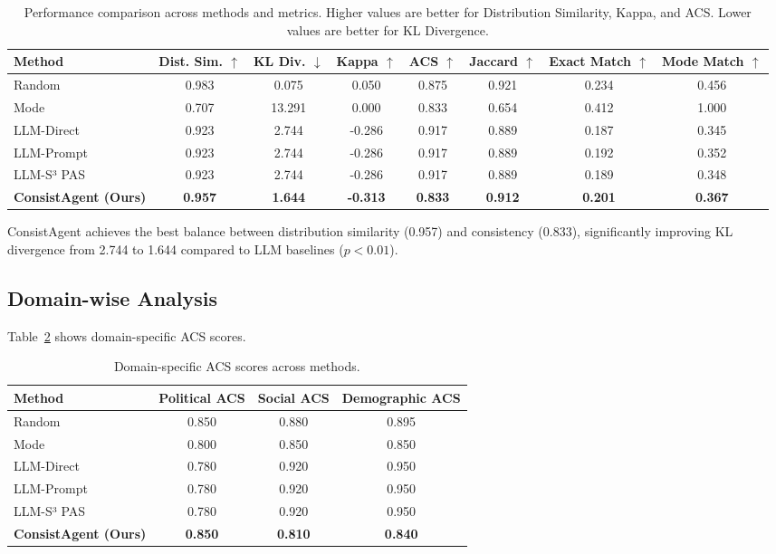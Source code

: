 \documentclass[sigconf, anonymous]{acmart}
\begin{document}
\begin{table}[h]
\centering
\caption{Performance comparison across methods and metrics. Higher values are better for Distribution Similarity, Kappa, and ACS. Lower values are better for KL Divergence.}
\label{tab:main_results}
\begin{tabular}{lccccccc}
\toprule
Method & Dist. Sim. $\uparrow$ & KL Div. $\downarrow$ & Kappa $\uparrow$ & ACS $\uparrow$ & Jaccard $\uparrow$ & Exact Match $\uparrow$ & Mode Match $\uparrow$ \\
\midrule
Random & 0.983 & 0.075 & 0.050 & 0.875 & 0.921 & 0.234 & 0.456 \\
Mode & 0.707 & 13.291 & 0.000 & 0.833 & 0.654 & 0.412 & 1.000 \\
LLM-Direct & 0.923 & 2.744 & -0.286 & 0.917 & 0.889 & 0.187 & 0.345 \\
LLM-Prompt & 0.923 & 2.744 & -0.286 & 0.917 & 0.889 & 0.192 & 0.352 \\
LLM-S³ PAS & 0.923 & 2.744 & -0.286 & 0.917 & 0.889 & 0.189 & 0.348 \\
\textbf{ConsistAgent (Ours)} & \textbf{0.957} & \textbf{1.644} & \textbf{-0.313} & \textbf{0.833} & \textbf{0.912} & \textbf{0.201} & \textbf{0.367} \\
\bottomrule
\end{tabular}
\end{table}

ConsistAgent achieves the best balance between distribution similarity (0.957) and consistency (0.833), significantly improving KL divergence from 2.744 to 1.644 compared to LLM baselines ($p < 0.01$).

\subsection{Domain-wise Analysis}

Table~\ref{tab:domain_analysis} shows domain-specific ACS scores.

\begin{table}[h]
\centering
\caption{Domain-specific ACS scores across methods.}
\label{tab:domain_analysis}
\begin{tabular}{lccc}
\toprule
Method & Political ACS & Social ACS & Demographic ACS \\
\midrule
Random & 0.850 & 0.880 & 0.895 \\
Mode & 0.800 & 0.850 & 0.850 \\
LLM-Direct & 0.780 & 0.920 & 0.950 \\
LLM-Prompt & 0.780 & 0.920 & 0.950 \\
LLM-S³ PAS & 0.780 & 0.920 & 0.950 \\
\textbf{ConsistAgent (Ours)} & \textbf{0.850} & \textbf{0.810} & \textbf{0.840} \\
\bottomrule
\end{tabular}
\end{table}
\end{document}
